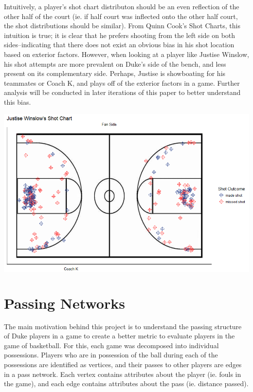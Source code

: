 \documentclass[12pt,twoside]{dukestatscithesis}
\theoremstyle{definition}
\theoremstyle{definition}
\theoremstyle{definition}
\theoremstyle{remark}
\begin{document}
Intuitively, a player's shot chart distributon should be an even
reflection of the other half of the court (ie. if half court was
inflected onto the other half court, the shot distributions should be
similar). From Quinn Cook's Shot Charts, this intuition is true; it is
clear that he prefers shooting from the left side on both
sides--indicating that there does not exist an obvious bias in his shot
location based on exterior factors. However, when looking at a player
like Justise Winslow, his shot attempts are more prevalent on Duke's
side of the bench, and less present on its complementary side. Perhaps,
Justise is showboating for his teammates or Coach K, and plays off of
the exterior factors in a game. Further analysis will be conducted in
later iterations of this paper to better understand this bias.

\includegraphics{img/shotchart_justisewinslow.png}

\chapter{Passing Networks}\label{passing-networks}

The main motivation behind this project is to understand the passing
structure of Duke players in a game to create a better metric to
evaluate players in the game of basketball. For this, each game was
decomposed into individual possessions. Players who are in possession of
the ball during each of the possessions are identified as vertices, and
their passes to other players are edges in a pass network. Each vertex
contains attributes about the player (ie. fouls in the game), and each
edge contains attributes about the pass (ie. distance passed).
\end{document}
